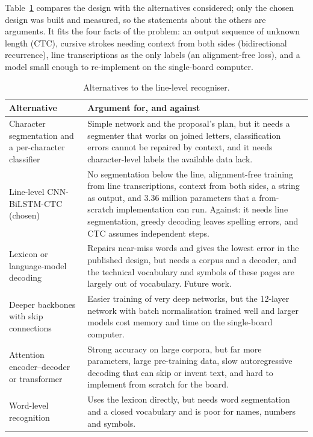 Table~\ref{tab:rec-alt} compares the design with the alternatives considered; only the chosen design was built and measured, so the statements about the others are arguments.
It fits the four facts of the problem: an output sequence of unknown length (CTC), cursive strokes needing context from both sides (bidirectional recurrence), line transcriptions as the only labels (an alignment-free loss), and a model small enough to re-implement on the single-board computer.

\begin{table}[h]
\centering
\fontsize{8.5}{10.2}\selectfont
\setlength{\tabcolsep}{4pt}
\begin{tabularx}{\linewidth}{|p{3.1cm}|X|}
\hline
\textbf{Alternative} & \textbf{Argument for, and against} \\
\hline
Character segmentation and a per-character classifier & Simple network and the proposal's plan, but it needs a segmenter that works on joined letters, classification errors cannot be repaired by context, and it needs character-level labels the available data lack. \\
\hline
Line-level CNN-BiLSTM-CTC (chosen) & No segmentation below the line, alignment-free training from line transcriptions, context from both sides, a string as output, and 3.36 million parameters that a from-scratch implementation can run. Against: it needs line segmentation, greedy decoding leaves spelling errors, and CTC assumes independent steps. \\
\hline
Lexicon or language-model decoding & Repairs near-miss words and gives the lowest error in the published design, but needs a corpus and a decoder, and the technical vocabulary and symbols of these pages are largely out of vocabulary. Future work. \\
\hline
Deeper backbones with skip connections & Easier training of very deep networks, but the 12-layer network with batch normalisation trained well and larger models cost memory and time on the single-board computer. \\
\hline
Attention encoder--decoder or transformer & Strong accuracy on large corpora, but far more parameters, large pre-training data, slow autoregressive decoding that can skip or invent text, and hard to implement from scratch for the board. \\
\hline
Word-level recognition & Uses the lexicon directly, but needs word segmentation and a closed vocabulary and is poor for names, numbers and symbols. \\
\hline
\end{tabularx}
\caption{Alternatives to the line-level recogniser.}
\label{tab:rec-alt}
\end{table}
